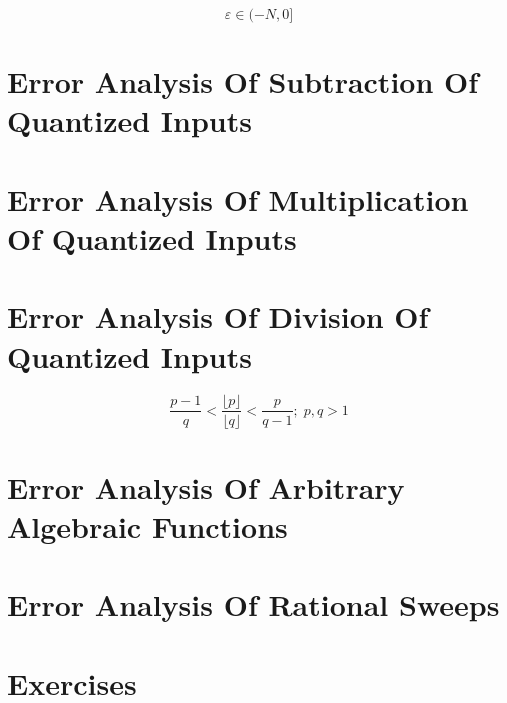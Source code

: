 \begin{equation}
\label{eq:cqua0:eaqi:005}
\varepsilon \in (-N,0]
\end{equation}

\section{Error Analysis Of Subtraction Of Quantized Inputs}

\section{Error Analysis Of Multiplication Of Quantized Inputs}

\section{Error Analysis Of Division Of Quantized Inputs}

\begin{equation}
\frac{p-1}{q}
<
\frac{\lfloor p \rfloor}{\lfloor q \rfloor}
<
\frac{p}{q-1}; \; p,q > 1
\end{equation}

\section{Error Analysis Of Arbitrary Algebraic Functions}

\section{Error Analysis Of Rational Sweeps}

\section{Exercises}


